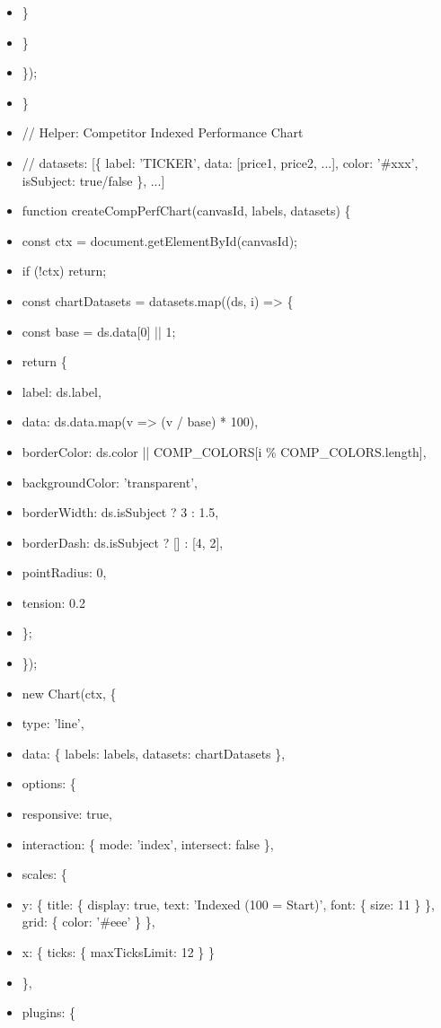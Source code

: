 \documentclass[11pt]{article}
\begin{document}
\begin{itemize}[leftmargin=*,itemsep=2pt,topsep=2pt]
\item {} \}
\item {} \}
\item {} \});
\item {} \}
\item {} // Helper: Competitor Indexed Performance Chart
\item {} // datasets: [\{ label: 'TICKER', data: [price1, price2, ...], color: '\#xxx', isSubject: true/false \}, ...]
\item {} function createCompPerfChart(canvasId, labels, datasets) \{
\item {} const ctx = document.getElementById(canvasId);
\item {} if (!ctx) return;
\item {} const chartDatasets = datasets.map((ds, i) => \{
\item {} const base = ds.data[0] || 1;
\item {} return \{
\item {} label: ds.label,
\item {} data: ds.data.map(v => (v / base) * 100),
\item {} borderColor: ds.color || COMP\_\allowbreak{}COLORS[i \% COMP\_\allowbreak{}COLORS.length],
\item {} backgroundColor: 'transparent',
\item {} borderWidth: ds.isSubject ? 3 : 1.5,
\item {} borderDash: ds.isSubject ? [] : [4, 2],
\item {} pointRadius: 0,
\item {} tension: 0.2
\item {} \};
\item {} \});
\item {} new Chart(ctx, \{
\item {} type: 'line',
\item {} data: \{ labels: labels, datasets: chartDatasets \},
\item {} options: \{
\item {} responsive: true,
\item {} interaction: \{ mode: 'index', intersect: false \},
\item {} scales: \{
\item {} y: \{ title: \{ display: true, text: 'Indexed (100 = Start)', font: \{ size: 11 \} \}, grid: \{ color: '\#eee' \} \},
\item {} x: \{ ticks: \{ maxTicksLimit: 12 \} \}
\item {} \},
\item {} plugins: \{

\end{itemize}
\end{document}
